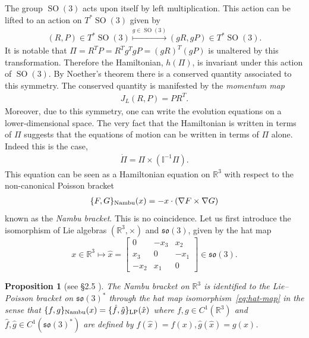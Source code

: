 \documentclass[12pt]{amsart}
\newcommand{\so}{\ensuremath{\mathfrak{so}}}
\newcommand{\R}{\ensuremath{\mathbb{R}}}
\newtheorem{prop}[thm]{Proposition}
\DeclareMathOperator{\SO}{SO}
\begin{document}
  The group $\SO(3)$ acts upon itself by left multiplication.
  This action can be lifted to an action on $T^*\SO(3)$ given by
  \begin{align*}
    (R,P) \in T^* \SO(3) \stackrel{g \in \SO(3) }{\mapsto}
    (g R , gP ) \in T^* \SO(3).
  \end{align*}
  It is notable that $\Pi = R^T P = R^T g^T g P = (gR)^T (gP)$
  is unaltered by this transformation.
  Therefore the Hamiltonian, $h(\Pi)$, is invariant under this action of $\SO(3)$.
  By Noether's theorem there is a conserved quantity associated to 
  this symmetry.
  The conserved quantity is manifested by the \emph{momentum map}
  \begin{align*}
    J_L(R,P) = PR^T .
  \end{align*}
  Moreover, due to this symmetry, one can write the evolution equations
  on a lower-dimensional space.
  The very fact that the Hamiltonian is written in terms of $\Pi$
  suggests that the equations of motion can be written in terms of $\Pi$ alone.
  Indeed this is the case,
  \begin{align}
    \dot{\Pi} = \Pi \times (\mathbb{I}^{-1} \Pi ). \label{eq:rigid_body}
  \end{align}
  This equation can be seen as a Hamiltonian equation on $\mathbb{R}^3$
  with respect to the non-canonical Poisson bracket
  \begin{align}
    \{ F , G \}_{\rm Nambu}(x)  = - x \cdot (\nabla F \times \nabla G) \label{eq:Nambu}
  \end{align}
  known as the \emph{Nambu bracket}.
  This is no coincidence. Let us first introduce the isomorphism of
  Lie algebras $(\R^3,\times)$ and $\so(3)$, given by the hat map
  \begin{equation}\label{eq:hat-map}
    x \in \R^3 \mapsto
    \hat{x} = 
    \begin{bmatrix}
      0   & -x_3 &  x_2 \\
      x_3 & 0    & -x_1 \\
     -x_2 &  x_1 & 0
    \end{bmatrix} \in \so(3).
  \end{equation}
  \begin{prop}[see \S 2.5 \cite{HolmBook2}] \label{prop:Nambu}
    The Nambu bracket on $\mathbb{R}^3$
    is identified to the Lie--Poisson bracket on $\so(3)^*$
    through the hat map isomorphism~\eqref{eq:hat-map}
    in the sense that $\{ f,g\}_{\rm Nambu}( x) = \{ \hat{f} , \hat{g} \}_{\rm LP}( \hat{x})$
    where $f,g \in C^1(\mathbb{R}^3)$ and 
    $\hat{f},\hat{g} \in C^1(\so(3)^*)$ are defined by 
    $\hat{f}( \hat{x} ) = f(x), \hat{g}( \hat{x} ) = g(x)$.
  \end{prop}
\end{document}
